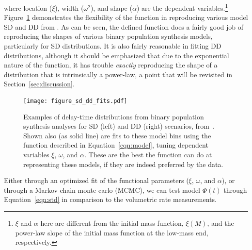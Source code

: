 \documentclass[apj, linenumbers]{aastex62}
\begin{document}
\noindent where location ($\xi$), width ($\omega^2$), and shape ($\alpha$) are the dependent variables.\footnote{$\xi$ and $\alpha$ here are different from the initial mass function, $\xi(M)$, and the power-law slope of the initial mass function at the low-mass end, respectively.} Figure~\ref{fig:dtd_families} demonstrates the flexibility of the function in reproducing various model SD and DD from \cite{Nelemans:2013}. As can be seen, the defined function does a fairly good job of reproducing the shapes of various binary population synthesis models, particularly for SD distributions. It is also fairly reasonable in fitting DD distributions, although it should be emphasized that due to the exponential nature of the function, it has trouble \textit{exactly} reproducing the shape of a distribution that is intrinsically a power-law, a point that will be revisited in Section~\ref{sec:discussion}.

\begin{figure}[t]
   \centering
   \texttt{[image: figure\_sd\_dd\_fits.pdf]}
   \caption{\footnotesize Examples of delay-time distributions from binary population synthesis analyses for SD (left) and DD (right) scenarios, from~\cite{Nelemans:2013}. Shown also (as solid line) are fits to these model bins using the function described in Equation~\ref{eqn:model}, tuning dependent variables $\xi$, $\omega$, and $\alpha$. These are the best the function can do at representing these models, if they are indeed preferred by the data.}
   \label{fig:dtd_families}
\end{figure}

Either through an optimized fit of the functional parameters ($\xi$, $\omega$, and $\alpha$), or through a Markov-chain monte carlo (MCMC), we can test model $\Phi(t)$ through Equation~\ref{eqn:std} in comparison to the volumetric rate measurements.
\end{document}
